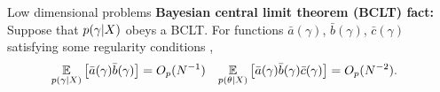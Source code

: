 \begin{frame}[t]{Low dimensional problems}
{\textbf{Bayesian central limit theorem (BCLT) fact: }Suppose that $p(\gamma
\vert X)$ obeys a BCLT. For functions $\bar{a}(\gamma)$,
$\bar{b}(\gamma)$, $\bar{c}(\gamma)$ satisfying some regularity conditions
\citep{kass:1990:posteriorexpansions},
%
\begin{align*}
%
\expect{\p(\gamma \vert \xvec)}
    {\bar{a}(\gamma) \bar{b}(\gamma)} ={}& O_p(N^{-1})
    &
\expect{\p(\theta \vert \xvec)}
    {\bar{a}(\gamma) \bar{b}(\gamma) \bar{c}(\gamma)} ={}&
    O_p(N^{-2}).
%
\end{align*}
%
\hrulefill
}
%


\end{frame}




